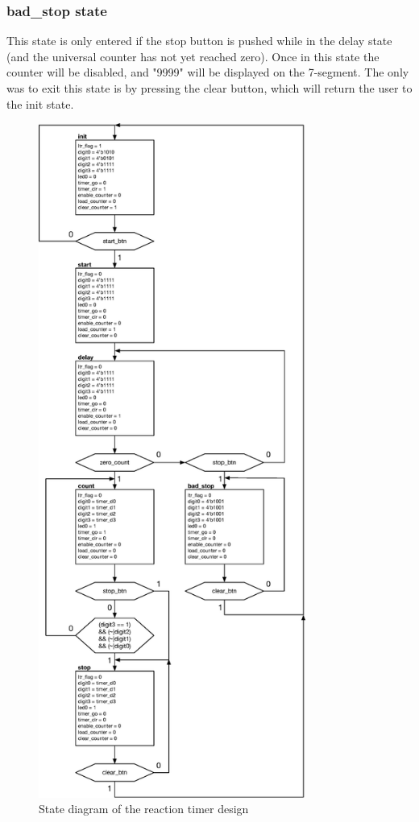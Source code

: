 \documentclass[11pt]{article}
\begin{document}
\subsubsection{bad\_stop state}
This state is only entered if the stop button is pushed while in the delay state (and the universal counter has not yet reached zero). Once in this state the counter will be disabled, and "9999" will be displayed on the 7-segment. The only was to exit this state is by pressing the clear button, which will return the user to the init state.

\pagebreak
\begin{figure}[H]
	\includegraphics [width=3.45in]{./figures/state_diagram.eps}
	\centering
	\caption{State diagram of the reaction timer design}
	\label{fig:state_diagram}
\end{figure}
\end{document}
